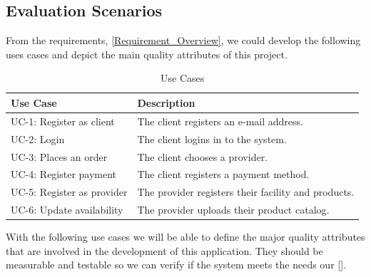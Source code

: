 \subsection{Evaluation Scenarios} \label{table_use_case}
From the requirements, \ref{Requirement_Overview}, we could develop the following uses cases and depict the main quality 
attributes of this project. 

\begin{table}[H]    
    \begin{tabularx}{\textwidth}{lX}
    \toprule
    Use Case & Description  \\
    \midrule
    UC-1: Register as \gls{client} & The \gls{client} registers an e-mail address.\\
    UC-2: Login & The \gls{client} logins in to the system. \\
    UC-3: Places an order & The \gls{client} chooses a \gls{provider}. \\
    UC-4: Register payment & The \gls{client} registers a payment method. \\
    UC-5: Register as \gls{provider} & The \gls{provider} registers their facility and products. \\
    UC-6: Update availability & The \gls{provider} uploads their product catalog. \\
    \bottomrule
    \end{tabularx}
    \caption{Use Cases}
\end{table}

With the following use cases we will  be able to define the major quality attributes that are involved in the 
development of this application. They should be measurable and testable so we can verify if the system meets 
the needs our  [\cite{refbook:DSHC}].

